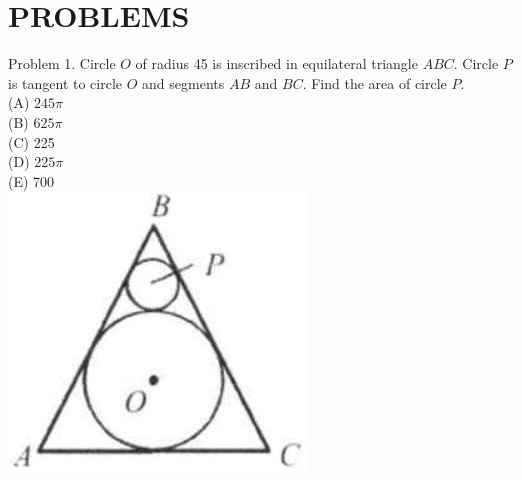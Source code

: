 \documentclass[10pt]{article}
\begin{document}
\section*{PROBLEMS}
Problem 1. Circle \(O\) of radius 45 is inscribed in equilateral triangle \(A B C\). Circle \(P\) is tangent to circle \(O\) and segments \(A B\) and \(B C\). Find the area of circle \(P\).\\
(A) \(245 \pi\)\\
(B) \(625 \pi\)\\
(C) 225\\
(D) \(225 \pi\)\\
(E) 700\\
\includegraphics[max width=\textwidth, center]{2025_04_17_97bc1f7e44d93c271a88g-184}
\end{document}
